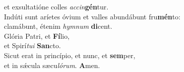 \oddverse et exsultatióne colles \textit{ac}\textit{cin}\textbf{gén}tur.\\
\evenverse Indúti sunt aríetes óvium et valles abundábunt fru\textbf{mén}to:~\*\\
\evenverse clamábunt, étenim \textit{hym}\textit{num} \textbf{di}cent.\\
\oddverse Glória Patri, et \textbf{Fí}lio,~\*\\
\oddverse et Spirí\textit{tu}\textit{i} \textbf{San}cto.\\
\evenverse Sicut erat in princípio, et nunc, et \textbf{sem}per,~\*\\
\evenverse et in sǽcula sæcu\textit{ló}\textit{rum}. \textbf{A}men.\\
